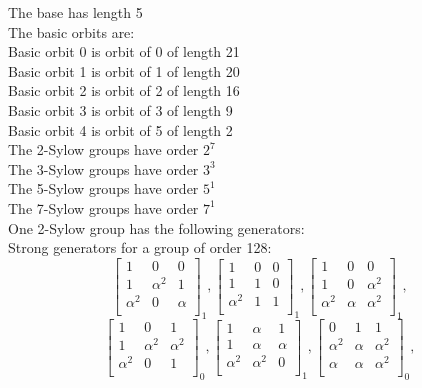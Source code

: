\bigskip
The base has length 5\\
The basic orbits are: \\
Basic orbit 0 is orbit of 0 of length 21\\
Basic orbit 1 is orbit of 1 of length 20\\
Basic orbit 2 is orbit of 2 of length 16\\
Basic orbit 3 is orbit of 3 of length 9\\
Basic orbit 4 is orbit of 5 of length 2\\
The 2-Sylow groups have order $2^{7}$\\
The 3-Sylow groups have order $3^{3}$\\
The 5-Sylow groups have order $5^{1}$\\
The 7-Sylow groups have order $7^{1}$\\
One 2-Sylow group has the following generators:\\
Strong generators for a group of order 128:
$$
\left[
\begin{array}{*{3}{r}}
1 & 0 & 0\\
1 & \alpha^{2} & 1\\
\alpha^{2} & 0 & \alpha \\
\end{array}
\right]
_{1}
, 
\left[
\begin{array}{*{3}{r}}
1 & 0 & 0\\
1 & 1 & 0\\
\alpha^{2} & 1 & 1\\
\end{array}
\right]
_{1}
, 
\left[
\begin{array}{*{3}{r}}
1 & 0 & 0\\
1 & 0 & \alpha^{2}\\
\alpha^{2} & \alpha  & \alpha^{2}\\
\end{array}
\right]
_{1}
, 
$$
$$
\left[
\begin{array}{*{3}{r}}
1 & 0 & 1\\
1 & \alpha^{2} & \alpha^{2}\\
\alpha^{2} & 0 & 1\\
\end{array}
\right]
_{0}
, 
\left[
\begin{array}{*{3}{r}}
1 & \alpha  & 1\\
1 & \alpha  & \alpha \\
\alpha^{2} & \alpha^{2} & 0\\
\end{array}
\right]
_{1}
, 
\left[
\begin{array}{*{3}{r}}
0 & 1 & 1\\
\alpha^{2} & \alpha  & \alpha^{2}\\
\alpha  & \alpha  & \alpha^{2}\\
\end{array}
\right]
_{0}
, 
$$
